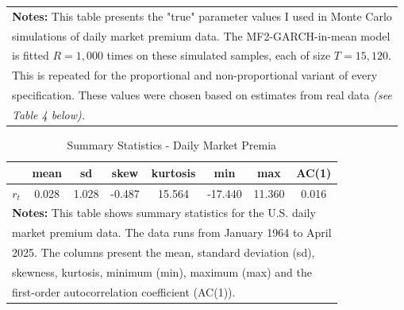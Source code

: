 \documentclass[12pt]{article}
\begin{document}
\begin{table}[!ht]
\begin{tabular}{ccccccccccc}
\multicolumn{11}{l}{\textbf{Notes:} This table presents the "true" parameter values I used in Monte Carlo}\\
\multicolumn{11}{l}{simulations of daily market premium data. The MF2-GARCH-in-mean model}\\
\multicolumn{11}{l}{is fitted $R=1,000$ times on these simulated samples, each of size $T=15,120$.}\\
\multicolumn{11}{l}{This is repeated for the proportional and non-proportional variant of every}\\
\multicolumn{11}{l}{specification. These values were chosen based on estimates from real data \textit{(see}}\\
\multicolumn{11}{l}{\textit{Table 4 below).}}\\
\midrule
\midrule
\end{tabular}
\end{table}

\begin{table}[!ht]
\centering
\caption{Summary Statistics - Daily Market Premia}
\begin{tabular}{cccccccc}
\midrule
\midrule
\mbox{} & mean & sd & skew & kurtosis & min & max & AC(1)\\
\midrule
$r_t$ & 0.028 & 1.028 & -0.487 & 15.564 & -17.440 & 11.360 & 0.016\\
\midrule
\multicolumn{8}{l}{\textbf{Notes:} This table shows summary statistics for the U.S. daily}\\
\multicolumn{8}{l}{market premium data. The data runs from January 1964 to April}\\
\multicolumn{8}{l}{2025. The columns present the mean, standard deviation (sd),}\\
\multicolumn{8}{l}{skewness, kurtosis, minimum (min), maximum (max) and the}\\
\multicolumn{8}{l}{first-order autocorrelation coefficient (AC(1)).}\\
\midrule
\midrule
\end{tabular}
\end{table}
\end{document}
